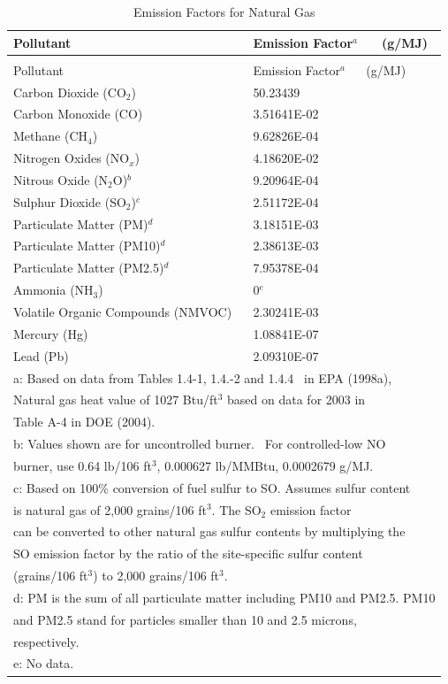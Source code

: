 \begin{longtable}[c]{p{4.5in}p{1.5in}}
\caption{Emission Factors for Natural Gas \label{table:emission-factors-for-natural-gas}} \tabularnewline
\toprule
Pollutant & Emission Factor\(^a\)  ~~ (g/MJ) \tabularnewline
\midrule
\endfirsthead

\caption[]{Emission Factors for Natural Gas} \tabularnewline
\toprule
Pollutant & Emission Factor\(^a\)  ~~ (g/MJ) \tabularnewline
\midrule
\endhead

Carbon Dioxide (CO\(_2\)) & 50.23439 \tabularnewline
Carbon Monoxide (CO) & 3.51641E-02 \tabularnewline
Methane (CH\(_4\)) & 9.62826E-04 \tabularnewline
Nitrogen Oxides (NO\(_x\)) & 4.18620E-02 \tabularnewline
Nitrous Oxide (N\(_2\)O)\(^b\) & 9.20964E-04 \tabularnewline
Sulphur Dioxide (SO\(_2\))\(^c\) & 2.51172E-04 \tabularnewline
Particulate Matter (PM)\(^d\) & 3.18151E-03 \tabularnewline
Particulate Matter (PM10)\(^d\) & 2.38613E-03 \tabularnewline
Particulate Matter (PM2.5)\(^d\) & 7.95378E-04 \tabularnewline
Ammonia (NH\(_3\)) & 0\(^e\) \tabularnewline
Volatile Organic Compounds (NMVOC) & 2.30241E-03 \tabularnewline
Mercury (Hg) & 1.08841E-07 \tabularnewline
Lead (Pb) & 2.09310E-07 \tabularnewline
\midrule
\multicolumn{2}{l}{a: Based on data from Tables 1.4-1, 1.4.-2 and 1.4.4~ in EPA (1998a),} \tabularnewline
\multicolumn{2}{l}{Natural gas heat value of 1027 Btu/ft\(^3\) based on data for 2003 in} \tabularnewline
\multicolumn{2}{l}{Table A-4 in DOE (2004).} \tabularnewline
\multicolumn{2}{l}{b: Values shown are for uncontrolled burner.~ For controlled-low NO } \tabularnewline
\multicolumn{2}{l}{burner, use 0.64 lb/106 ft\(^3\), 0.000627 lb/MMBtu, 0.0002679 g/MJ.} \tabularnewline
\multicolumn{2}{l}{c: Based on 100\% conversion of fuel sulfur to SO. Assumes sulfur content} \tabularnewline
\multicolumn{2}{l}{is natural gas of 2,000 grains/106 ft\(^3\). The SO\(_2\) emission factor} \tabularnewline
\multicolumn{2}{l}{can be converted to other natural gas sulfur contents by multiplying the} \tabularnewline
\multicolumn{2}{l}{SO emission factor by the ratio of the site-specific sulfur content} \tabularnewline
\multicolumn{2}{l}{(grains/106 ft\(^3\)) to 2,000 grains/106 ft\(^3\).} \tabularnewline
\multicolumn{2}{l}{d: PM is the sum of all particulate matter including PM10 and PM2.5. PM10} \tabularnewline
\multicolumn{2}{l}{and PM2.5 stand for particles smaller than 10 and 2.5 microns,} \tabularnewline
\multicolumn{2}{l}{respectively.} \tabularnewline
\multicolumn{2}{l}{e: No data.} \tabularnewline
\bottomrule
\end{longtable}

